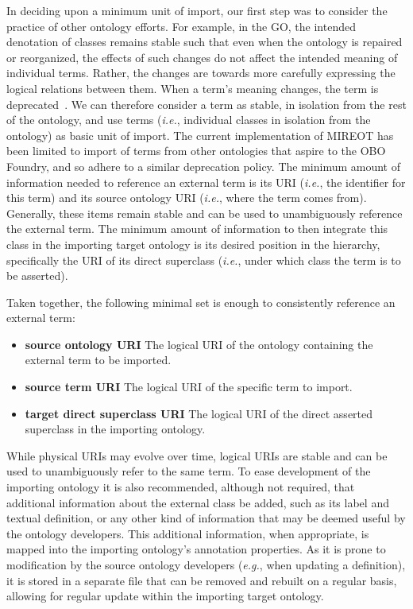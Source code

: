 \documentclass[jou]{ao2e}%
\begin{document}
In deciding upon a minimum unit of import, our first step was to consider the practice of other ontology efforts.
For example, in the \ac{GO}, the intended denotation of classes remains stable such that even when the ontology is repaired or reorganized, the effects of such changes do not affect the intended meaning of individual terms.
Rather, the changes are towards more carefully expressing the logical relations between them.
When a term's meaning changes, the term is deprecated~\citep{GOGuide}.
We can therefore consider a term as stable, in isolation from the rest of the ontology, and use terms (\emph{i.e.}, individual classes in isolation from the ontology) as basic unit of import.
The current implementation of \ac{MIREOT} has been limited to import of terms from other ontologies that aspire to the OBO Foundry, and so adhere to a similar deprecation policy.
The minimum amount of information needed to reference an external term is its \ac{URI} (\textit {i.e.}, the identifier for this term) and its source ontology \ac{URI} (\textit {i.e.}, where the term comes from). 
Generally, these items remain stable and can be used to unambiguously reference the external term.
The minimum amount of information to then integrate this class in the importing target ontology is its desired position in the hierarchy, specifically the URI of its direct superclass (\textit {i.e.}, under which class the term is to be asserted).

Taken together, the following minimal set is enough to consistently reference an external term:
\begin{itemize}
 \item \textbf{source ontology \ac{URI}} The logical \ac{URI} of the ontology containing the external term to be imported. 
 \item \textbf{source term \ac{URI}} The logical \ac{URI} of the specific term to import. 
 \item \textbf{target direct superclass \ac{URI}} The logical \ac{URI} of the direct asserted superclass in the importing ontology.
\end{itemize} 

While physical URIs may evolve over time, logical URIs are stable and can be used to unambiguously refer to the same term.
To ease development of the importing ontology it is also recommended, although not required, that additional information about the external class be added, such as its label and textual definition, or any other kind of information that may be deemed useful by the ontology developers.
This additional information, when appropriate, is mapped into the importing ontology's annotation properties. As it is prone to modification by the source ontology developers (\textit{e.g.}, when updating a definition), it is stored in a separate file that can be removed and rebuilt on a regular basis, allowing for regular update within the importing target ontology.
\end{document}
